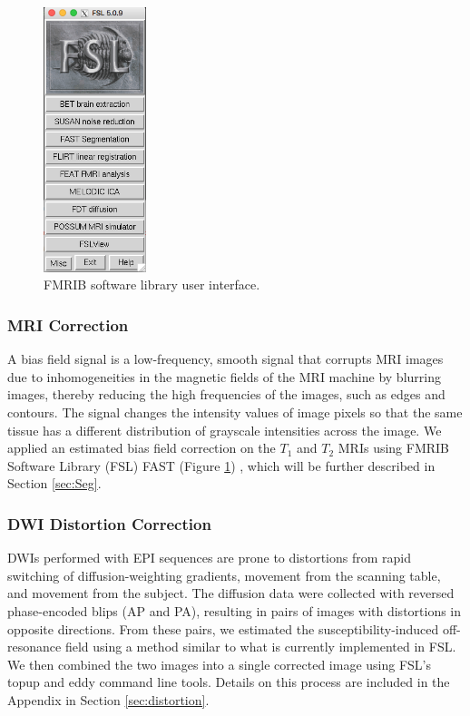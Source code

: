 \begin{figure}
    \centering
    \vspace{-63pt}
    \includegraphics[width=3cm]{Figures/FSL}
    \caption{FMRIB software library user interface.}
    \label{fig:fsl}
\end{figure}

\subsubsection{MRI Correction}

A bias field signal is a low-frequency, smooth signal that corrupts MRI images due to inhomogeneities in the magnetic fields of the MRI machine by blurring images, thereby reducing the high frequencies of the images, such as edges and contours. The signal changes the intensity values of image pixels so that the same tissue has a different distribution of grayscale intensities across the image. \cite{ref:bias} We applied an estimated bias field correction on the $T_1$ and $T_2$ MRIs using FMRIB Software Library (FSL) FAST (Figure \ref{fig:fsl}) \cite{ref:fslfast}, which will be further described in Section \ref{sec:Seg}.

\subsubsection{DWI Distortion Correction}

DWIs performed with EPI sequences are prone to distortions from rapid switching of diffusion-weighting gradients, movement from the scanning table, and movement from the subject. The diffusion data were collected with reversed phase-encoded blips (AP and PA), resulting in pairs of images with distortions in opposite directions. From these pairs, we estimated the susceptibility-induced off-resonance field using a method \cite{ref:fsltopup1} similar to what is currently implemented in FSL.\cite{ref:fsltopup2} We then combined the two images into a single corrected image using FSL's topup and eddy command line tools. Details on this process are included in the Appendix in Section \ref{sec:distortion}.

